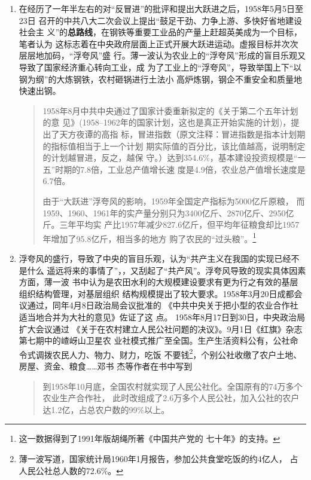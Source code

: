 \begin{enumerate}
\item 在经历了一年半左右的对``反冒进''的批评和提出大跃进之后，1958年5月5日至23日
  召开的中共八大二次会议上提出``鼓足干劲、力争上游、多快好省地建设社会主
  义''的\textbf{总路线}，在钢铁等重要工业品的产量上赶超英美成为一个目标，笔者认为
  这标志着在中央政府层面上正式开展大跃进运动。虚报目标并次次层层地加码，``浮夸风''盛
  行。薄一波认为农业上的``浮夸风''形成的盲目乐观又导致了国家经济重心转向工业，成
  为了工业上的``浮夸风''，导致举国上下``以钢为纲''的大炼钢铁，农村砸锅进行土法小
  高炉炼钢，钢企不重安全和质量地快速出钢。

  \begin{quotation}
    1958年8月中共中央通过了国家计委重新拟定的《关于第二个五年计划的意
    见》(1958--1962年的国家计划，这也是真正开始实施的计划)，提出了天方夜谭的高指
    标，冒进指数（原文注释：冒进指数是指本计划期的指标值相当于上一个计划
    期实际值的百分比，该比值越高，说明制定的计划越冒进，反之，越保
    守。）达到354.6\%，基本建设投资规模是“一五”时期的7.8倍，工业总产值增长速
    度是4.9倍，农业总产值增长速度是6.7倍。\cite{shiyiwu}

    由于``大跃进''浮夸风的影响，1959年全国定产指标为5000亿斤原粮，
    而1959、1960、1961年的实产量分别只为3400亿斤、2870亿斤、2950亿斤。三年平均实
    产比1957年减少827.6亿斤，但平均年征粮食却比1957年增加了95.8亿斤，相当多的地方
    购了农民的``过头粮''。\footnote{这一数据得到了1991年版胡绳所著《中国共产党的
      七十年》的支持。}
  \end{quotation}

  
\item 浮夸风的盛行，导致了中央的盲目乐观，认为``共产主义在我国的实现已经不是什么
  遥远将来的事情了''，，又刮起了``共产风''。浮夸风导致的现实具体因素方面，薄一波
  书中认为是农田水利的大规模建设要求有更为行之有效的基层组织结构管理，对基层组织
  结构规模提出了较大要求。1958年3月20日成都会议通过，同年4月8日政治局会议批准的
  《中共中央关于把小型的农业合作社适当地合并为大社的意见》佐证了这
  点。 1958年8月17日到30日，中央政治局扩大会议通过
  《关于在农村建立人民公社问题的决议》。9月1日《红旗》杂志第七期中的嵖岈山卫星农
  业社模式推广至全国。生产生活资料公有，公社命令式调拨农民人力、物力、财力，吃饭
  不要钱\footnote{薄一波写道，国家统计局1960年1月报告，参加公共食堂吃饭的约4亿人，
    占人民公社总人数的72.6\%。}，个别公社收缴了农户土地、房屋、资金、粮食……邓书
  杰等作者在书中写到
  \begin{quotation}
    到1958年10月底，全国农村就实现了人民公社化。全国原有的74万多个农业生产合作社，
    此时改组成了2.6万多个人民公社，加入公社的农户达1.2亿，占总农户数的99\%以上。
  \end{quotation}


\end{enumerate}
